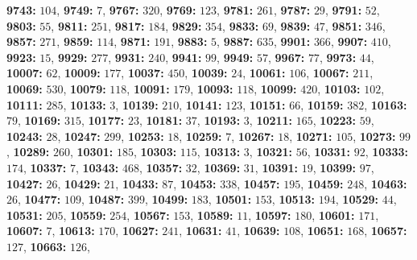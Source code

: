 \textsf{\bfseries 9743:} $104$, \textsf{\bfseries 9749:} $7$, \textsf{\bfseries 9767:} $320$, \textsf{\bfseries 9769:} $123$, \textsf{\bfseries 9781:} $261$, \textsf{\bfseries 9787:} $29$, \textsf{\bfseries 9791:} $52$, \textsf{\bfseries 9803:} $55$, \textsf{\bfseries 9811:} $251$, \textsf{\bfseries 9817:} $184$, \textsf{\bfseries 9829:} $354$, \textsf{\bfseries 9833:} $69$, \textsf{\bfseries 9839:} $47$, \textsf{\bfseries 9851:} $346$, \textsf{\bfseries 9857:} $271$, \textsf{\bfseries 9859:} $114$, \textsf{\bfseries 9871:} $191$, \textsf{\bfseries 9883:} $5$, \textsf{\bfseries 9887:} $635$, \textsf{\bfseries 9901:} $366$, \textsf{\bfseries 9907:} $410$, \textsf{\bfseries 9923:} $15$, \textsf{\bfseries 9929:} $277$, \textsf{\bfseries 9931:} $240$, \textsf{\bfseries 9941:} $99$, \textsf{\bfseries 9949:} $57$, \textsf{\bfseries 9967:} $77$, \textsf{\bfseries 9973:} $44$, \textsf{\bfseries 10007:} $62$, \textsf{\bfseries 10009:} $177$, \textsf{\bfseries 10037:} $450$, \textsf{\bfseries 10039:} $24$, \textsf{\bfseries 10061:} $106$, \textsf{\bfseries 10067:} $211$, \textsf{\bfseries 10069:} $530$, \textsf{\bfseries 10079:} $118$, \textsf{\bfseries 10091:} $179$, \textsf{\bfseries 10093:} $118$, \textsf{\bfseries 10099:} $420$, \textsf{\bfseries 10103:} $102$, \textsf{\bfseries 10111:} $285$, \textsf{\bfseries 10133:} $3$, \textsf{\bfseries 10139:} $210$, \textsf{\bfseries 10141:} $123$, \textsf{\bfseries 10151:} $66$, \textsf{\bfseries 10159:} $382$, \textsf{\bfseries 10163:} $79$, \textsf{\bfseries 10169:} $315$, \textsf{\bfseries 10177:} $23$, \textsf{\bfseries 10181:} $37$, \textsf{\bfseries 10193:} $3$, \textsf{\bfseries 10211:} $165$, \textsf{\bfseries 10223:} $59$, \textsf{\bfseries 10243:} $28$, \textsf{\bfseries 10247:} $299$, \textsf{\bfseries 10253:} $18$, \textsf{\bfseries 10259:} $7$, \textsf{\bfseries 10267:} $18$, \textsf{\bfseries 10271:} $105$, \textsf{\bfseries 10273:} $99$, \textsf{\bfseries 10289:} $260$, \textsf{\bfseries 10301:} $185$, \textsf{\bfseries 10303:} $115$, \textsf{\bfseries 10313:} $3$, \textsf{\bfseries 10321:} $56$, \textsf{\bfseries 10331:} $92$, \textsf{\bfseries 10333:} $174$, \textsf{\bfseries 10337:} $7$, \textsf{\bfseries 10343:} $468$, \textsf{\bfseries 10357:} $32$, \textsf{\bfseries 10369:} $31$, \textsf{\bfseries 10391:} $19$, \textsf{\bfseries 10399:} $97$, \textsf{\bfseries 10427:} $26$, \textsf{\bfseries 10429:} $21$, \textsf{\bfseries 10433:} $87$, \textsf{\bfseries 10453:} $338$, \textsf{\bfseries 10457:} $195$, \textsf{\bfseries 10459:} $248$, \textsf{\bfseries 10463:} $26$, \textsf{\bfseries 10477:} $109$, \textsf{\bfseries 10487:} $399$, \textsf{\bfseries 10499:} $183$, \textsf{\bfseries 10501:} $153$, \textsf{\bfseries 10513:} $194$, \textsf{\bfseries 10529:} $44$, \textsf{\bfseries 10531:} $205$, \textsf{\bfseries 10559:} $254$, \textsf{\bfseries 10567:} $153$, \textsf{\bfseries 10589:} $11$, \textsf{\bfseries 10597:} $180$, \textsf{\bfseries 10601:} $171$, \textsf{\bfseries 10607:} $7$, \textsf{\bfseries 10613:} $170$, \textsf{\bfseries 10627:} $241$, \textsf{\bfseries 10631:} $41$, \textsf{\bfseries 10639:} $108$, \textsf{\bfseries 10651:} $168$, \textsf{\bfseries 10657:} $127$, \textsf{\bfseries 10663:} $126$, 
